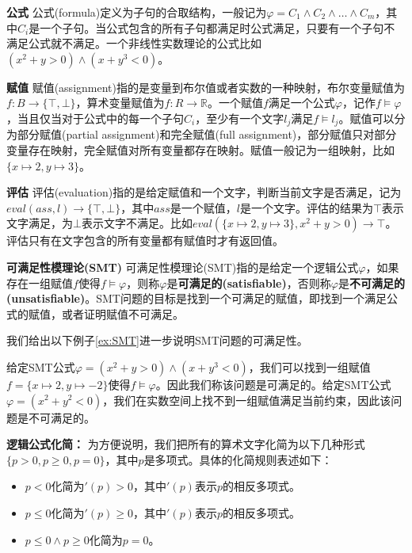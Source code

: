 \begin{definition}{\textbf{公式}}
公式(formula)定义为子句的合取结构，一般记为$\varphi = C_1 \wedge C_2 \wedge \dots \wedge C_m$，其中$C_i$是一个子句。当公式包含的所有子句都满足时公式满足，只要有一个子句不满足公式就不满足。一个非线性实数理论的公式比如$(x^2 + y > 0) \wedge (x + y^3 < 0)$。
\end{definition}


\begin{definition}{\textbf{赋值}}
赋值(assignment)指的是变量到布尔值或者实数的一种映射，布尔变量赋值为$f: B \rightarrow \{\top, \bot\}$，算术变量赋值为$f: R \rightarrow \mathbb{R}$。一个赋值$f$满足一个公式$\varphi$，记作$f \models \varphi$，当且仅当对于公式中的每一个子句$C_i$，至少有一个文字$l_j$满足$f \models l_j$。赋值可以分为部分赋值(partial assignment)和完全赋值(full assignment)，部分赋值只对部分变量存在映射，完全赋值对所有变量都存在映射。赋值一般记为一组映射，比如$\{x \mapsto 2, y \mapsto 3\}$。
\end{definition}

\begin{definition}{\textbf{评估}}
评估(evaluation)指的是给定赋值和一个文字，判断当前文字是否满足，记为$eval (ass, l) \rightarrow \{\top, \bot\}$，其中$ass$是一个赋值，$l$是一个文字。评估的结果为$\top$表示文字满足，为$\bot$表示文字不满足。比如$eval (\{x \mapsto 2, y \mapsto 3\}, x^2 + y > 0) \rightarrow \top$。评估只有在文字包含的所有变量都有赋值时才有返回值。
\end{definition}

\begin{definition}{\textbf{可满足性模理论(SMT)}}
可满足性模理论(SMT)指的是给定一个逻辑公式$\varphi$，如果存在一组赋值$f$使得$f \models \varphi$，则称$\varphi$是\textbf{可满足的(satisfiable)}，否则称$\varphi$是\textbf{不可满足的(unsatisfiable)}。SMT问题的目标是找到一个可满足的赋值，即找到一个满足公式的赋值，或者证明赋值不可满足。
\end{definition}

我们给出以下例子\ref{ex:SMT}进一步说明SMT问题的可满足性。

\begin{example}
\label{ex:SMT}
给定SMT公式$\varphi = (x^2 + y > 0) \wedge (x + y^3 < 0)$，我们可以找到一组赋值$f = \{x \mapsto 2, y \mapsto -2\}$使得$f \models \varphi$。因此我们称该问题是可满足的。给定SMT公式$\varphi = (x^2 + y^2 < 0)$，我们在实数空间上找不到一组赋值满足当前约束，因此该问题是不可满足的。
\end{example}


\textbf{逻辑公式化简：} 为方便说明，我们把所有的算术文字化简为以下几种形式$\{p > 0, p \geq 0, p = 0\}$，其中$p$是多项式。具体的化简规则表述如下：
\begin{itemize}
    \item $p < 0$化简为$\prime(p) > 0$，其中$\prime(p)$表示$p$的相反多项式。
    \item $p \leq 0$化简为$\prime(p) \geq 0$，其中$\prime(p)$表示$p$的相反多项式。
    \item $p \leq 0 \wedge p \geq 0$化简为$p = 0$。
\end{itemize}


